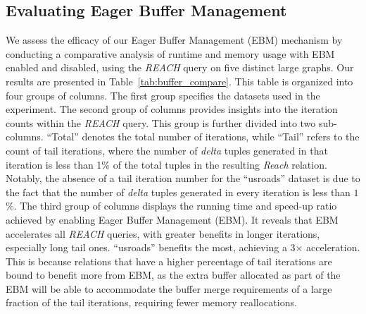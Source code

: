 \documentclass[nonacm,sigplan]{acmart}
\newcommand{\buffer}{Eager Buffer Management }
\begin{document}
\subsection{Evaluating \buffer}
\label{sec:eval-buffer}
We assess the efficacy of our \buffer (EBM) mechanism by conducting a comparative analysis of runtime and memory usage with EBM enabled and disabled, using the \textit{REACH} query on five distinct large graphs. 
Our results are presented in Table~\ref{tab:buffer_compare}. This table is organized into four groups of columns. The first group specifies the datasets used in the experiment. The second group of columns provides insights into the iteration counts within the \textit{REACH} query. This group is further divided into two sub-columns. ``Total'' denotes the total
number of iterations, while ``Tail'' refers to the count of tail iterations, where the number of \textit{delta} tuples generated in that iteration is less than 1\% of the total tuples in the resulting \emph{Reach} relation. Notably, the absence of a tail iteration number for the ``usroads'' dataset is due to the fact that the number of \textit{delta} tuples generated in every iteration is less than $1$\%. The third group of columns displays the running time and speed-up ratio achieved by enabling Eager Buffer Management (EBM). It reveals that EBM accelerates all \textit{REACH} queries, with greater benefits in longer iterations, especially long tail ones. ``\textsf{usroads}'' benefits the most, achieving a 3$\times$ acceleration. This is because relations that have a higher percentage of tail iterations are bound to benefit more from EBM, as the extra buffer allocated as part of the EBM will be able to accommodate the buffer merge requirements of a large fraction of the tail iterations, requiring fewer memory reallocations.
\end{document}
